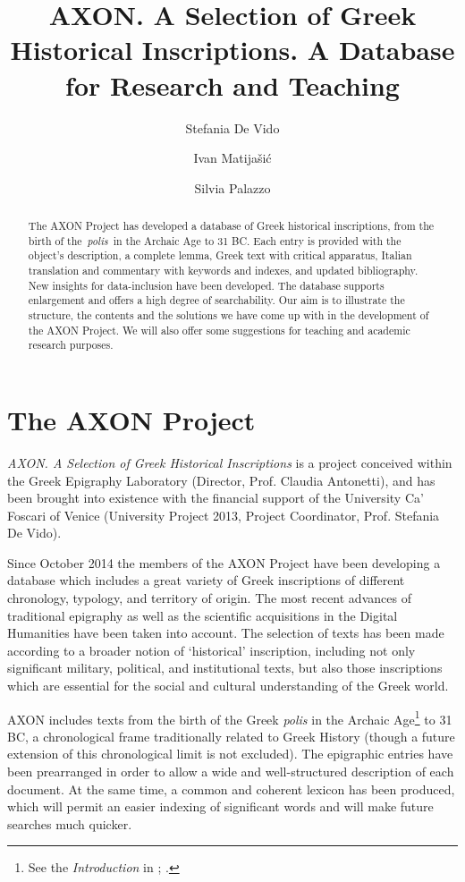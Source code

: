 \documentclass[amsthm,ebook]{saparticle}
\title{AXON. A Selection of Greek Historical Inscriptions. A Database for Research and Teaching}
\author[cafo]{Stefania De Vido}
\author[cafo]{Ivan Matijašić\corref{first}}
\author[cafo]{Silvia Palazzo}
\begin{document}
\maketitle
\begin{abstract}
The AXON Project has developed a database of Greek historical inscriptions, from the birth of the~\emph{polis}~in the Archaic
Age to 31 BC. Each entry is provided with the object’s description, a complete lemma, Greek text with critical
apparatus, Italian translation and commentary with keywords and indexes, and updated bibliography. New insights for
data-inclusion have been developed. The database supports enlargement and offers a high degree of searchability. Our
aim is to illustrate the structure, the contents and the solutions we have come up with in the development of the AXON
Project. We will also offer some suggestions for teaching and academic research purposes.


\end{abstract}




\section{The AXON Project }


\noindent \emph{AXON. A Selection of Greek Historical Inscriptions} is a project conceived within the Greek Epigraphy Laboratory
(Director, Prof. Claudia Antonetti), and has been brought into existence with the financial support of the University
Ca’ Foscari of Venice (University Project 2013, Project Coordinator, Prof. Stefania De Vido).

Since October 2014 the members of the AXON Project have been developing a database which includes a great variety of
Greek inscriptions of different chronology, typology, and territory of origin. The most recent advances of traditional
epigraphy as well as the scientific acquisitions in the Digital Humanities have been taken into account. The selection
of texts has been made according to a broader notion of `historical' inscription, including not only significant
military, political, and institutional texts, but also those inscriptions which are essential for the social and
cultural understanding of the Greek world. 

AXON includes texts from the birth of the Greek \emph{polis} in the Archaic Age\footnote{ See the \emph{Introduction} in \citet{nielsen_inventory_2004}; \citet{hansen_polis:_2006}. } to 31 BC, a chronological frame traditionally related to Greek History (though a future
extension of this chronological limit is not excluded). The epigraphic entries have been prearranged in order to allow
a wide and well-structured description of each document. At the same time, a common and coherent lexicon has been
produced, which will permit an easier indexing of significant words and will make future searches much quicker. 
\end{document}
